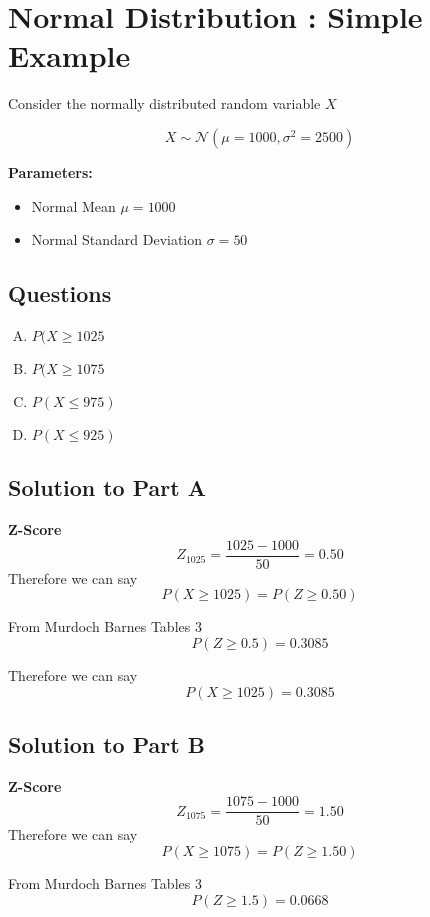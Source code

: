 \documentclass[a4paper,12pt]{article}
\begin{document}
	\section*{Normal Distribution : Simple Example}
	
	
	Consider the normally distributed random variable $X$
	
	\[ X \sim \mathcal{N}(\mu=1000,\sigma^2 = 2500) \]
	
\noindent \textbf{Parameters:}
	\begin{itemize}
		\item Normal Mean $\mu =1000$
		\item Normal Standard Deviation $\sigma =50$
	\end{itemize}
\subsection*{Questions}
	
	\begin{enumerate}[(A)]
\item $P(X \geq 1025$
\item $P(X \geq 1075$
\item $P(X \leq 975)$
\item $P(X \leq 925)$
	\end{enumerate}
	
\subsection*{Solution to Part A}
	
\noindent \textbf{Z-Score}	
\[ Z_{1025} = \frac{1025-1000}{50} = 0.50\]
Therefore we can say
\[ P(X \geq 1025)  = P(Z \geq 0.50) \]
	
\noindent From Murdoch Barnes Tables 3
	\[  P(Z \geq 0.5) = 0.3085
	\]
	
\noindent 	Therefore we can say 
	\[ P(X \geq 1025)  =  0.3085 \]
	
\subsection*{Solution to Part B}
\noindent \textbf{Z-Score}	
\[ Z_{1075} = \frac{1075-1000}{50} = 1.50\]
Therefore we can say
\[ P(X \geq 1075)  = P(Z \geq 1.50) \]
	
\noindent From Murdoch Barnes Tables 3
	\[  P(Z \geq 1.5) =  0.0668
	\]
	
\end{document}
